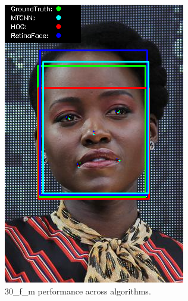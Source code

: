 \documentclass{l4proj}
\begin{document}
\begin{appendices}
\begin{figure}[h!]
  \centering
  \begin{minipage}{0.49\textwidth}
    \centering
     \includegraphics[width=\textwidth]{images/appendix/30.png}
    \caption{30\_f\_m performance across algorithms.}
    \label{whoopi_result}
  \end{minipage}
    \hfill
    \begin{minipage}{0.49\textwidth}
    \centering

\end{minipage}
\end{figure}
\end{appendices}
\end{document}
